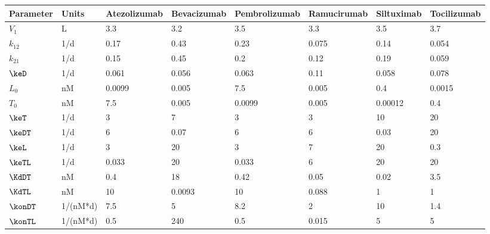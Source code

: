 \begin{tabular}{llllllll}
  \hline
Parameter & Units & Atezolizumab & Bevacizumab & Pembrolizumab & Ramucirumab & Siltuximab & Tocilizumab \\ 
  \hline
$V_1$ & L & 3.3 & 3.2 & 3.5 & 3.3 & 3.5 & 3.7 \\ 
  $k_{12}$ & 1/d & 0.17 & 0.43 & 0.23 & 0.075 & 0.14 & 0.054 \\ 
  $k_{21}$ & 1/d & 0.15 & 0.45 & 0.2 & 0.12 & 0.19 & 0.059 \\ 
  $\keD$ & 1/d & 0.061 & 0.056 & 0.063 & 0.11 & 0.058 & 0.078 \\ 
  $L_0$ & nM & 0.0099 & 0.005 & 7.5 & 0.005 & 0.4 & 0.0015 \\ 
  $T_0$ & nM & 7.5 & 0.005 & 0.0099 & 0.005 & 0.00012 & 0.4 \\ 
  $\keT$ & 1/d & 3 & 7 & 3 & 3 & 10 & 20 \\ 
  $\keDT$ & 1/d & 6 & 0.07 & 6 & 6 & 0.03 & 20 \\ 
  $\keL$ & 1/d & 3 & 20 & 3 & 7 & 20 & 0.3 \\ 
  $\keTL$ & 1/d & 0.033 & 20 & 0.033 & 6 & 20 & 20 \\ 
  $\KdDT$ & nM & 0.4 & 18 & 0.42 & 0.05 & 0.02 & 3.5 \\ 
  $\KdTL$ & nM & 10 & 0.0093 & 10 & 0.088 & 1 & 1 \\ 
  $\konDT$ & 1/(nM*d) & 7.5 & 5 & 8.2 & 2 & 10 & 1.4 \\ 
  $\konTL$ & 1/(nM*d) & 0.5 & 240 & 0.5 & 0.015 & 5 & 5 \\ 
   \hline
\end{tabular}
